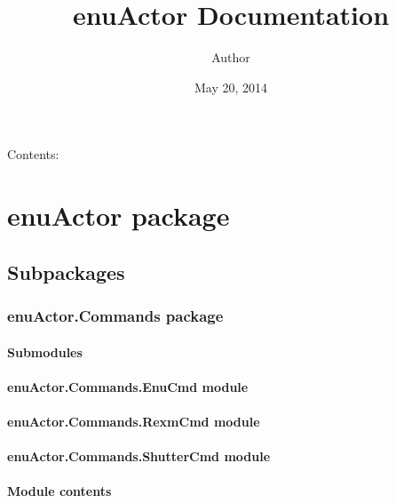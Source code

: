 \documentclass[letterpaper,10pt,english]{sphinxmanual}
\title{enuActor Documentation}
\date{May 20, 2014}
\author{Author}
\begin{document}
\maketitle
\tableofcontents
{}\label{index::doc}


Contents:


\chapter{enuActor package}
\label{enuActor::doc}\label{enuActor:welcome-to-enuactor-s-documentation}\label{enuActor:enuactor-package}

\section{Subpackages}
\label{enuActor:subpackages}

\subsection{enuActor.Commands package}
\label{enuActor.Commands::doc}\label{enuActor.Commands:enuactor-commands-package}

\subsubsection{Submodules}
\label{enuActor.Commands:submodules}

\subsubsection{enuActor.Commands.EnuCmd module}
\label{enuActor.Commands:enuactor-commands-enucmd-module}

\subsubsection{enuActor.Commands.RexmCmd module}
\label{enuActor.Commands:enuactor-commands-rexmcmd-module}

\subsubsection{enuActor.Commands.ShutterCmd module}
\label{enuActor.Commands:enuactor-commands-shuttercmd-module}

\subsubsection{Module contents}
\label{enuActor.Commands:module-contents}\label{enuActor.Commands:module-enuActor.Commands}
\end{document}
